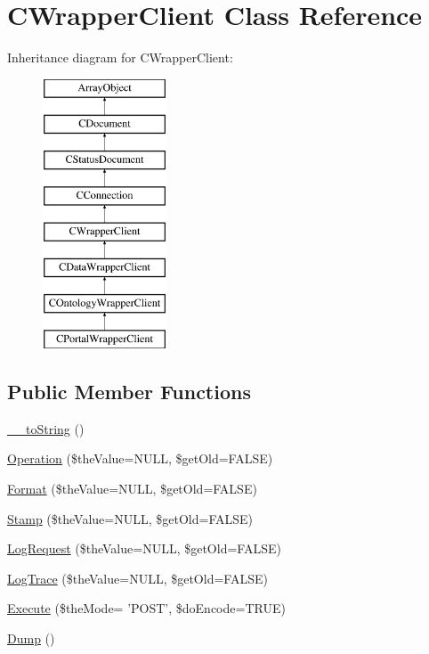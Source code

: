 \hypertarget{class_c_wrapper_client}{\section{C\-Wrapper\-Client Class Reference}
\label{class_c_wrapper_client}
}
Inheritance diagram for C\-Wrapper\-Client\-:\begin{figure}[H]
\begin{center}
\leavevmode
\includegraphics[height=8.000000cm]{class_c_wrapper_client}
\end{center}
\end{figure}
\subsection*{Public Member Functions}
\begin{DoxyCompactItemize}
\item 
\hyperlink{class_c_wrapper_client_ab59e31a65a939dc99630aaabebdb01cf}{\-\_\-\-\_\-to\-String} ()
\item 
\hyperlink{class_c_wrapper_client_ae378229fd57b051ddf0e0a7abf599641}{Operation} (\$the\-Value=N\-U\-L\-L, \$get\-Old=F\-A\-L\-S\-E)
\item 
\hyperlink{class_c_wrapper_client_aeea011893f53a7df495f23e199cbc28b}{Format} (\$the\-Value=N\-U\-L\-L, \$get\-Old=F\-A\-L\-S\-E)
\item 
\hyperlink{class_c_wrapper_client_ac87e4af5c32d735f192c8041e83b3ce3}{Stamp} (\$the\-Value=N\-U\-L\-L, \$get\-Old=F\-A\-L\-S\-E)
\item 
\hyperlink{class_c_wrapper_client_a844a2e677c1e0fb0855255cb02b86be4}{Log\-Request} (\$the\-Value=N\-U\-L\-L, \$get\-Old=F\-A\-L\-S\-E)
\item 
\hyperlink{class_c_wrapper_client_a2020117737285ff3c2c3f0fae01136ff}{Log\-Trace} (\$the\-Value=N\-U\-L\-L, \$get\-Old=F\-A\-L\-S\-E)
\item 
\hyperlink{class_c_wrapper_client_abf6475dc50f52a1f80b2eebc91fe4b95}{Execute} (\$the\-Mode= 'P\-O\-S\-T', \$do\-Encode=T\-R\-U\-E)
\item 
\hyperlink{class_c_wrapper_client_a8d444816f701541f165c112c9230fb97}{Dump} ()
\end{DoxyCompactItemize}
